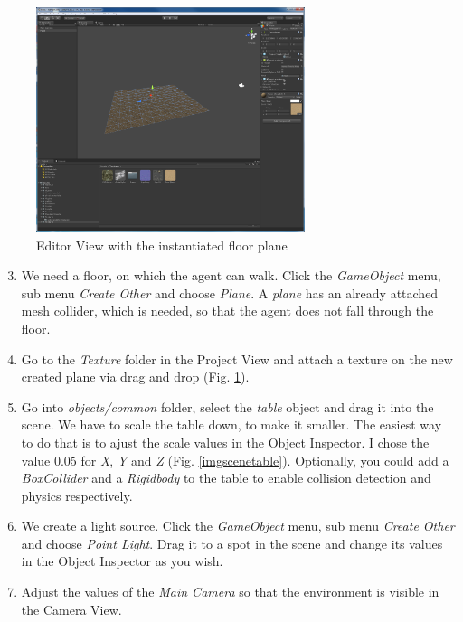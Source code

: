\documentclass[10pt,final]{scrreprt}
\begin{document}
\begin{figure}[p]
\begin{center}
\includegraphics[width=0.70\textwidth]{images/scenewithfloor.png}
\end{center}
\caption{Editor View with the instantiated floor plane}
\label{imgscenewithfloor}
\end{figure}

\begin{enumerate}
\setcounter{enumi}{2}
\item We need a floor, on which the agent can walk. Click the \emph{GameObject} menu,  sub menu \emph{Create Other} and choose \emph{Plane}. A \emph{plane} has an already attached mesh collider, which is needed, so that the agent does not fall through the floor.
\item Go to the \emph{Texture} folder in the Project View and attach a texture on the new created plane via drag and drop (Fig. \ref{imgscenewithfloor}).
\item Go into \emph{objects/common} folder, select the \emph{table} object and drag it into the scene. We have to scale the table down, to make it smaller. The easiest way to do that is to ajust the scale values in the Object Inspector. I chose the value 0.05 for \emph{X}, \emph{Y} and \emph{Z} (Fig. \ref{imgscenetable}). Optionally, you could add a \emph{BoxCollider} and a \emph{Rigidbody} to the table to enable collision detection and physics respectively.
\item We create a light source.  Click the \emph{GameObject} menu,  sub menu \emph{Create Other} and choose \emph{Point Light}. Drag it to a spot in the scene and change its values in the Object Inspector as you wish.
\item Adjust the values of the \emph{Main Camera}  so that the environment is visible in the Camera View.
\end{enumerate}
\end{document}
